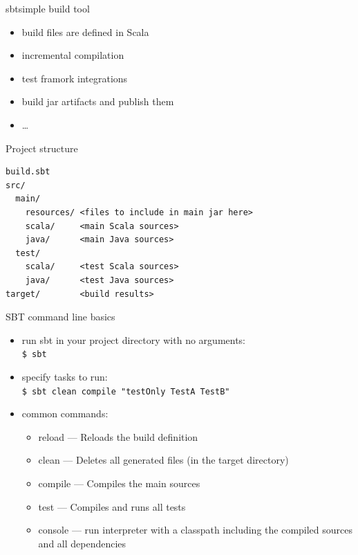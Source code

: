 \documentclass[aspectratio=169]{beamer}
\begin{document}
\begin{frame}{sbt}{simple build tool}
  \begin{itemize}
    \item build files are defined in Scala
    \item incremental compilation
    \item test framork integrations
    \item build jar artifacts and publish them
    \item \ldots
  \end{itemize}
\end{frame}

\begin{frame}[fragile]{Project structure}
\begin{verbatim}
build.sbt
src/
  main/
    resources/ <files to include in main jar here>
    scala/     <main Scala sources>
    java/      <main Java sources>
  test/
    scala/     <test Scala sources>
    java/      <test Java sources>
target/        <build results>
\end{verbatim}
\end{frame}

\begin{frame}{SBT command line basics}
  \begin{itemize}
    \item run sbt in your project directory with no arguments:\\ \texttt{\$ sbt}
    \item specify tasks to run:\\ \texttt{\$ sbt clean compile "testOnly TestA TestB"}
    \item common commands:
      \begin{itemize}
        \item reload --- Reloads the build definition
        \item clean --- Deletes all generated files (in the target directory)
        \item compile --- Compiles the main sources
        \item test --- Compiles and runs all tests
        \item console --- run interpreter with a classpath including the compiled sources
          and all dependencies
      \end{itemize}
  \end{itemize}
\end{frame}
\end{document}
